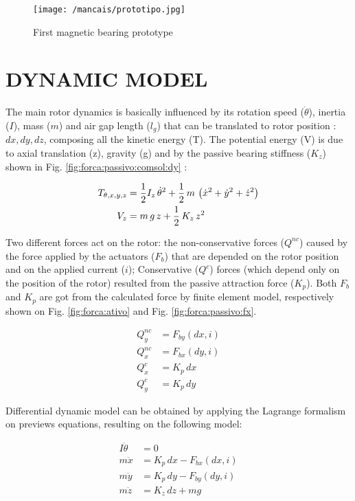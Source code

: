 \documentclass[10pt,fleqn,a4paper,twoside]{article}
\begin{document}
	\begin{figure}[ht]
	\centering
	\texttt{[image: /mancais/prototipo.jpg]}
	\caption{First magnetic bearing prototype}
	\label{fig:prototipo}
	\end{figure}	
	
	\section{\uppercase{Dynamic Model}}

	The main rotor dynamics is basically influenced by its rotation speed ($\dot{\theta}$), inertia ($I$), mass ($m$) and air gap length ($l_g$) that can be  translated to rotor position : $dx,dy,dz$, composing all the kinetic energy (T). The potential energy (V) is due to axial translation (z), gravity (g) and by the passive bearing stiffness ($K_z$) shown in Fig. \ref{fig:forca:passivo:comsol:dy} : 
	
	\begin{align}
		T_{\theta, x, y, z} &= \frac{1}{2} I_z \, \dot{\theta}^2 + \frac{1}{2} \, m \, \left( \dot{x}^2 + \dot{y}^2 + \dot{z}^2 \right) \notag \\
		V_z &= m \, g \, z + \frac{1}{2} \, K_z \, z^2
	\end{align}	

	Two different forces act on the rotor: the  non-conservative forces ($Q^{nc}$) caused by the force applied by the actuators ($F_b$) that are depended on the rotor position and on the applied current ($i$); Conservative ($Q^{c}$) forces (which depend only on the position of the rotor) resulted from the passive attraction force ($K_p$). Both $F_b$ and $K_p$ are got from the calculated force by finite element model, respectively shown on Fig. \ref{fig:forca:ativo} and Fig. \ref{fig:forca:passivo:fx}.

	\begin{align}
		Q_y^{nc} &= F_{by}(dx,i)  \\
		Q_x^{nc} &= F_{bx}(dy,i)  \\
		Q^{c}_x  &= K_p \, dx \\
		Q^{c}_y  &= K_p \, dy 
	\end{align}
	
	Differential dynamic model can be obtained by applying the Lagrange formalism on previews equations, resulting on the following model:
			
	\begin{align}
		I \ddot{\theta} &= 0 \\
		m \ddot{x}		&= K_p \, dx  - F_{bx}(dx,i) \\
		m \ddot{y}		&= K_p \, dy  - F_{by}(dy,i)\\	
		m \ddot{z}  	&= K_z \, dz + m g 
	\end{align}
	
\end{document}

